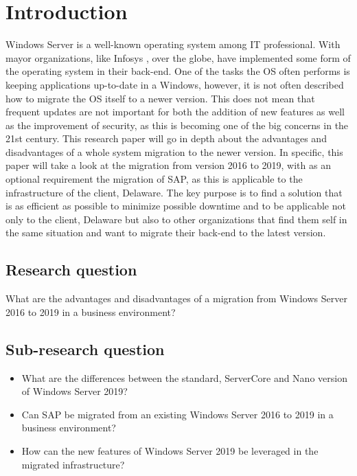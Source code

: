\section{Introduction}\label{sec:introduction}
Windows Server is a well-known operating system among IT professional. With mayor organizations, like Infosys \autocite{S.Chauhan2015}, over the globe, have implemented some form of the operating system in their back-end. One of the tasks the OS often performs is keeping applications up-to-date in a Windows, however, it is not often described how to migrate the OS itself to a newer version. 
This does not mean that frequent updates are not important for both the addition of new features as well as the improvement of security, as this is becoming one of the big concerns in the 21st century. 
This research paper will go in depth about the advantages and disadvantages of a whole system migration to the newer version. In specific, this paper will take a look at the migration from version 2016 to 2019, with as an optional requirement the migration of SAP, as this is applicable to the infrastructure of the client, Delaware.
The key purpose is to find a solution that is as efficient as possible to minimize possible downtime and to be applicable not only to the client, Delaware but also to other organizations that find them self in the same situation and want to migrate their back-end to the latest version.
\subsection{Research question}
What are the advantages and disadvantages of a migration from Windows Server 2016 to 2019 in a business environment?
\subsection{Sub-research question}
\begin{itemize}
	\item What are the differences between the standard, ServerCore and Nano version of Windows Server 2019?
	\item Can SAP be migrated from an existing Windows Server 2016 to 2019 in a business environment?
	\item How can the new features of Windows Server 2019 be leveraged in the migrated infrastructure? 
\end{itemize}
